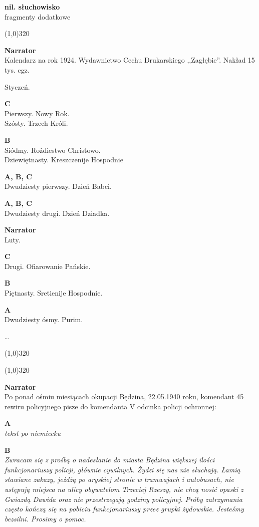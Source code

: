 \documentclass[11pt,a4paper,oneside]{article}
\begin{document}
\noindent
\textbf{nil. słuchowisko}\\
fragmenty dodatkowe
 
\line(1,0){320}

\textbf{Narrator}\\
Kalendarz na rok 1924. Wydawnictwo Cechu Drukarskiego
,,Zagłębie''. Nakład 15 tys. egz.

Styczeń.

\textbf{C}\\
Pierwszy. Nowy Rok. \\
Szósty. Trzech Króli.

\textbf{B}\\
Siódmy. Rożdiestwo Christowo. \\
Dziewiętnasty. Kreszczenije Hospodnie

\textbf{A, B, C}\\
Dwudziesty pierwszy. Dzień Babci.

\textbf{A, B, C}\\
Dwudziesty drugi. Dzień Dziadka.

\textbf{Narrator}\\
Luty.

\textbf{C}\\
Drugi. Ofiarowanie Pańskie.

\textbf{B}\\
Piętnasty. Sretienije Hospodnie.

\textbf{A}\\
Dwudziesty ósmy. Purim.

\dots{}

\line(1,0){320}

\newpage
\line(1,0){320}

\textbf{Narrator}\\
Po ponad ośmiu miesiącach okupacji Będzina, 22.05.1940 roku, komendant 45
rewiru policyjnego pisze do komendanta V odcinka policji ochronnej:


\textbf{A}\\
\emph{tekst po niemiecku}


\textbf{B}\\
\emph{Zwracam się z prośbą o nadesłanie do miasta Będzina większej ilości
funkcjonariuszy policji, głównie cywilnych. Żydzi się nas nie słuchają. Łamią
stawiane zakazy, jeżdżą po aryskiej stronie w tramwajach i autobusach, nie
ustępują miejsca na ulicy obywatelom Trzeciej Rzeszy, nie chcą nosić opaski
z Gwiazdą Dawida oraz nie przestrzegają godziny policyjnej. Próby zatrzymania
często kończą się na pobiciu funkcjonariuszy przez grupki żydowskie. Jesteśmy 
bezsilni. Prosimy o pomoc.}
\end{document}
